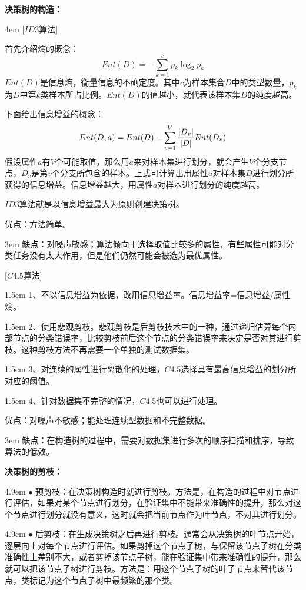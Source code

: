\documentclass[a4paper, 11pt]{article}
\begin{document}
\begin{CJK*}{GBK}{song}
{\bf 决策树的构造：}

\hangindent 4em
[$ID3$算法]

首先介绍熵的概念：
$$Ent(D) =  - \sum\limits_{k = 1}^c {{p_k}{{\log }_2}{p_k}} $$
$Ent(D)$是信息熵，衡量信息的不确定度。其中$c$为样本集合$D$中的类型数量，$p_k$为$D$中第$k$类样本所占比例。$Ent(D)$的值越小，就代表该样本集$D$的纯度越高。

下面给出信息增益的概念：
$$Ent(D,a) = Ent(D) - \sum\limits_{v = 1}^V {{{|{D_v}|} \over {|D|}}Ent({D_v})} $$
假设属性$a$有$V$个可能取值，那么用$a$来对样本集进行划分，就会产生$V$个分支节点，$D_v$是第$v$个分支所包含的样本。上式可计算出用属性$a$对样本集$D$进行划分所获得的信息增益。信息增益越大，用属性$a$对样本进行划分的纯度越高。

$ID3$算法就是以信息增益最大为原则创建决策树。

优点：方法简单。

\hangindent 3em
缺点：对噪声敏感；算法倾向于选择取值比较多的属性，有些属性可能对分类任务没有太大作用，但是他们仍然可能会被选为最优属性。


[$C4.5$算法]

\hangindent 1.5em
1、不以信息增益为依据，改用信息增益率。信息增益率=信息增益$/$属性熵。

\hangindent 1.5em
2、使用悲观剪枝。悲观剪枝是后剪枝技术中的一种，通过递归估算每个内部节点的分类错误率，比较剪枝前后这个节点的分类错误率来决定是否对其进行剪枝。这种剪枝方法不再需要一个单独的测试数据集。

\hangindent 1.5em
3、对连续的属性进行离散化的处理，$C$4.5选择具有最高信息增益的划分所对应的阈值。

\hangindent 1.5em
4、针对数据集不完整的情况，$C$4.5也可以进行处理。

优点：对噪声不敏感；能处理连续型数据和不完整数据。

\hangindent 3em
缺点：在构造树的过程中，需要对数据集进行多次的顺序扫描和排序，导致算法的低效。

{\bf 决策树的剪枝：}

\hangindent 4.9em
$\bullet$ 预剪枝：在决策树构造时就进行剪枝。方法是，在构造的过程中对节点进行评估，如果对某个节点进行划分，在验证集中不能带来准确性的提升，那么对这个节点进行划分就没有意义，这时就会把当前节点作为叶节点，不对其进行划分。

\hangindent 4.9em
$\bullet$ 后剪枝：在生成决策树之后再进行剪枝。通常会从决策树的叶节点开始，逐层向上对每个节点进行评估。如果剪掉这个节点子树，与保留该节点子树在分类准确性上差别不大，或者剪掉该节点子树，能在验证集中带来准确性的提升，那么就可以把该节点子树进行剪枝。方法是：用这个节点子树的叶子节点来替代该节点，类标记为这个节点子树中最频繁的那个类。

\end{CJK*}
\end{document}
